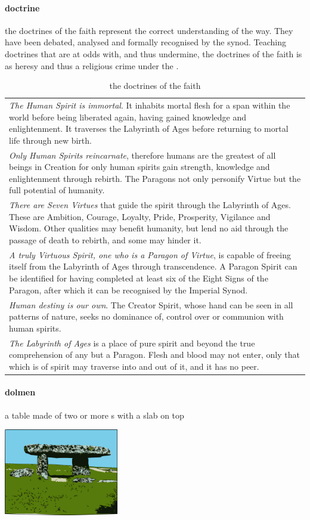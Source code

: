 \paragraph{doctrine} the doctrines of the faith represent the correct understanding of the way. They have been debated, analysed and formally recognised by the synod. Teaching doctrines that are at odds with, and thus undermine, the doctrines of the faith is as heresy and thus a religious crime under the .\begin{table} \begin{tabular}{p{}}\emph{The Human Spirit is immortal}. It inhabits mortal flesh for a span within the world before being liberated again, having gained knowledge and enlightenment. It traverses the Labyrinth of Ages before returning to mortal life through new birth.\\ \emph{Only Human Spirits reincarnate}, therefore humans are the greatest of all beings in Creation for only human spirits gain strength, knowledge and enlightenment through rebirth. The Paragons not only personify Virtue but the full potential of humanity.\\\emph{There are Seven Virtues} that guide the spirit through the Labyrinth of Ages. These are Ambition, Courage, Loyalty, Pride, Prosperity, Vigilance and Wisdom. Other qualities may benefit humanity, but lend no aid through the passage of death to rebirth, and some may hinder it.\\\emph{A truly Virtuous Spirit, one who is a Paragon of Virtue}, is capable of freeing itself from the Labyrinth of Ages through transcendence. A Paragon Spirit can be identified for having completed at least six of the Eight Signs of the Paragon, after which it can be recognised by the Imperial Synod.\\\emph{Human destiny is our own}. The Creator Spirit, whose hand can be seen in all patterns of nature, seeks no dominance of, control over or communion with human spirits.\\\emph{The Labyrinth of Ages} is a place of pure spirit and beyond the true comprehension of any but a Paragon. Flesh and blood may not enter, only that which is of spirit may traverse into and out of it, and it has no peer.\end{tabular}\caption{the doctrines of the faith}\end{table}
\paragraph{dolmen} a table made of two or more s with a slab on top \begin{center}\includegraphics[width=5cm]{encyclopedia/dolmen}\end{center}
